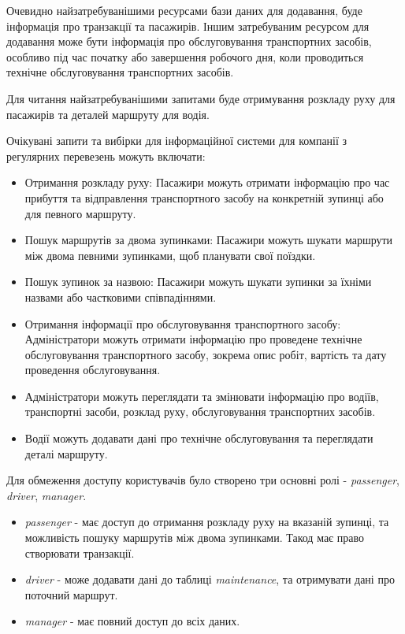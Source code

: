 \documentclass[oneside,14pt]{extarticle}
\begin{document}
Очевидно найзатребуванішими ресурсами бази даних для додавання, буде інформація про транзакції та пасажирів. Іншим затребуваним ресурсом для додавання може бути інформація про обслуговування транспортних засобів, особливо під час початку або завершення робочого дня, коли проводиться технічне обслуговування транспортних засобів.

Для читання найзатребуванішими запитами буде отримування розкладу руху для пасажирів та деталей маршруту для водія.

Очікувані запити та вибірки для інформаційної системи для компанії з регулярних перевезень можуть включати:
\begin{itemize}
\item Отримання розкладу руху: Пасажири можуть отримати інформацію про час прибуття та відправлення транспортного засобу на конкретній зупинці або для певного маршруту.
\item Пошук маршрутів за двома зупинками: Пасажири можуть шукати маршрути між двома певними зупинками, щоб планувати свої поїздки.
\item Пошук зупинок за назвою: Пасажири можуть шукати зупинки за їхніми назвами або частковими співпадіннями.
\item Отримання інформації про обслуговування транспортного засобу: Адміністратори можуть отримати інформацію про проведене технічне обслуговування транспортного засобу, зокрема опис робіт, вартість та дату проведення обслуговування.
\item Адміністратори можуть переглядати та змінювати інформацію про водіїв, транспортні засоби, розклад руху, обслуговування транспортних засобів.
\item Водії можуть додавати дані про технічне обслуговування та переглядати деталі маршруту.
\end{itemize}

Для обмеження доступу користувачів було створено три основні ролі - \textit{passenger}, \textit{driver}, \textit{manager}.

\begin{itemize}
\item \textit{passenger} - має доступ до отримання розкладу руху на вказаній зупинці, та можливість пошуку маршрутів між двома зупинками. Такод має право створювати транзакції.
\item \textit{driver} - може додавати дані до таблиці \textit{maintenance}, та отримувати дані про поточний маршрут.
\item \textit{manager} - має повний доступ до всіх даних.
\end{itemize}
\end{document}
